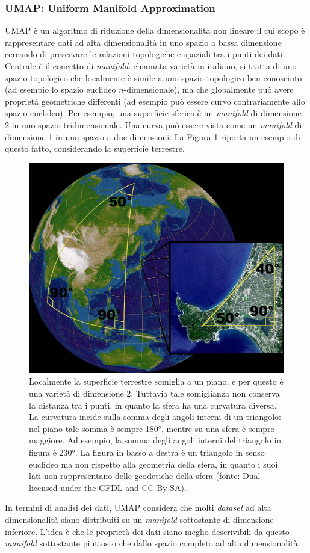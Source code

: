 \documentclass[12pt,italian]{report}
\begin{document}
	\subsubsection{UMAP: Uniform Manifold Approximation}
	\label{Umap}
	UMAP \cite{https://doi.org/10.48550/arxiv.1802.03426} è un algoritmo di riduzione della dimensionalità non lineare il cui scopo è rappresentare dati ad alta dimensionalità in uno spazio a bassa dimensione cercando di preservare le relazioni topologiche e spaziali tra i punti dei dati. Centrale è il concetto di \textit{manifold}: chiamata varietà in italiano, si tratta di uno spazio topologico che localmente è simile a uno spazio topologico ben conosciuto (ad esempio lo spazio euclideo $n$-dimensionale), ma che globalmente può avere proprietà geometriche differenti (ad esempio può essere curvo contrariamente allo spazio euclideo). Per esempio, una superficie sferica è un \textit{manifold} di dimensione 2 in uno spazio tridimensionale. Una curva può essere vista come un \textit{manifold} di dimensione 1 in uno spazio a due dimensioni. La Figura \ref{fig:manifoldexample} riporta un esempio di questo fatto, considerando la superficie terrestre.
	\begin{figure}[h]
		\centering
		\includegraphics[width=0.6\linewidth]{immagini/ManifoldExample}
		\caption{Localmente la superficie terrestre somiglia a un piano, e per questo è una varietà di dimensione 2. Tuttavia tale somiglianza non conserva la distanza tra i punti, in quanto la sfera ha una curvatura diversa. La curvatura incide sulla somma degli angoli interni di un triangolo: nel piano tale somma è sempre 180°, mentre su una sfera è sempre maggiore. Ad esempio, la somma degli angoli interni del triangolo in figura è 230°. La figura in basso a destra è un triangolo in senso euclideo ma non rispetto alla geometria della sfera, in quanto i suoi lati non rappresentano delle geodetiche della sfera (fonte: \cite{manifold} Dual-licensed under the GFDL and CC-By-SA).}
		\label{fig:manifoldexample}
	\end{figure}
	In termini di analisi dei dati, UMAP considera che molti \textit{dataset} ad alta dimensionalità siano distribuiti su un \textit{manifold} sottostante di dimensione inferiore. L'idea è che le proprietà dei dati siano meglio descrivibili da questo \textit{manifold} sottostante piuttosto che dallo spazio completo ad alta dimensionalità.
	
\end{document}
